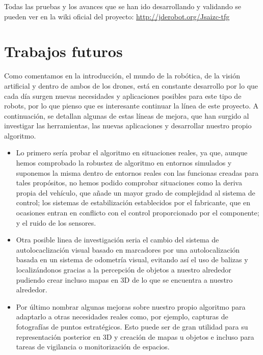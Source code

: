 \hspace{1cm} Todas las pruebas y los avances que se han ido desarrollando y validando se pueden ver en la wiki oficial del proyecto: \url{http://jderobot.org/Jsaizc-tfg}

\section{Trabajos futuros}
\hspace{1cm} Como comentamos en la introducción, el mundo de la robótica, de la visión artificial y dentro de ambos de los drones, está en constante desarrollo por lo que cada día surgen nuevas necesidades y aplicaciones posibles para este tipo de robots, por lo que pienso que es interesante continuar la línea de este proyecto. A continuación, se detallan algunas de estas líneas de mejora, que han surgido al investigar las herramientas, las nuevas aplicaciones y desarrollar nuestro propio algoritmo.

\begin{itemize}
	\item Lo primero sería probar el algoritmo en situaciones reales, ya que, aunque hemos comprobado la robustez de algoritmo en entornos simulados y suponemos la misma dentro de entornos reales con las funcionas creadas para tales propósitos, no hemos podido comprobar situaciones como la deriva propia del vehículo, que añade un mayor grado de complejidad al sistema de control; los sistemas de estabilización establecidos por el fabricante, que en ocasiones entran en conflicto con el control proporcionado por el componente; y el ruido de los sensores.
	\item Otra posible linea de investigación seria el cambio del sistema de autolocaclización visual basado en marcadores por una autolocalización basada en un sistema de odometría visual, evitando así el uso de balizas y localizándonos gracias a la percepción de objetos a nuestro alrededor pudiendo crear incluso mapas en 3D de lo que se encuentra a nuestro alrededor.
	\item Por último nombrar algunas mejoras sobre nuestro propio algoritmo para adaptarlo a otras necesidades reales como, por ejemplo, capturas de fotografías de puntos estratégicos. Esto puede ser de gran utilidad para su representación posterior en 3D y creación de mapas u objetos e incluso para tareas de vigilancia o monitorización de espacios.
\end{itemize}
